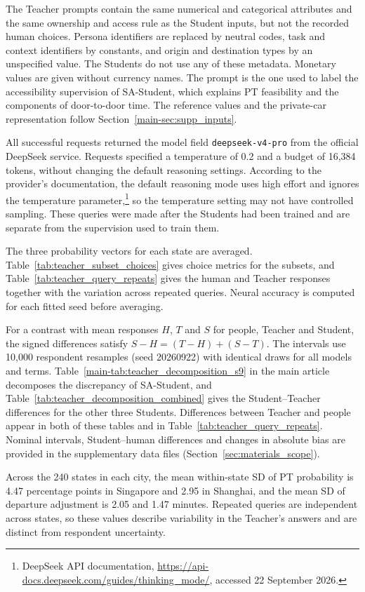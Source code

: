 The Teacher prompts contain the same numerical and categorical attributes and the same ownership and access rule as the Student inputs, but not the recorded human choices. Persona identifiers are replaced by neutral codes, task and context identifiers by constants, and origin and destination types by an unspecified value. The Students do not use any of these metadata. Monetary values are given without currency names. The prompt is the one used to label the accessibility supervision of SA-Student, which explains PT feasibility and the components of door-to-door time. The reference values and the private-car representation follow Section~\ref{main-sec:supp_inputs}.

All successful requests returned the model field \texttt{deepseek-v4-pro} from the official DeepSeek service. Requests specified a temperature of 0.2 and a budget of 16,384 tokens, without changing the default reasoning settings. According to the provider's documentation, the default reasoning mode uses high effort and ignores the temperature parameter,\footnote{DeepSeek API documentation, \url{https://api-docs.deepseek.com/guides/thinking_mode/}, accessed 22 September 2026.} so the temperature setting may not have controlled sampling. These queries were made after the Students had been trained and are separate from the supervision used to train them.

The three probability vectors for each state are averaged. Table~\ref{tab:teacher_subset_choices} gives choice metrics for the subsets, and Table~\ref{tab:teacher_query_repeats} gives the human and Teacher responses together with the variation across repeated queries. Neural accuracy is computed for each fitted seed before averaging.



For a contrast with mean responses $H$, $T$ and $S$ for people, Teacher and Student, the signed differences satisfy $S-H=(T-H)+(S-T)$. The intervals use 10,000 respondent resamples (seed 20260922) with identical draws for all models and terms. Table~\ref{main-tab:teacher_decomposition_s9} in the main article decomposes the discrepancy of SA-Student, and Table~\ref{tab:teacher_decomposition_combined} gives the Student--Teacher differences for the other three Students. Differences between Teacher and people appear in both of these tables and in Table~\ref{tab:teacher_query_repeats}. Nominal intervals, Student--human differences and changes in absolute bias are provided in the supplementary data files (Section~\ref{sec:materials_scope}).

Across the 240 states in each city, the mean within-state SD of PT probability is 4.47 percentage points in Singapore and 2.95 in Shanghai, and the mean SD of departure adjustment is 2.05 and 1.47 minutes. Repeated queries are independent across states, so these values describe variability in the Teacher's answers and are distinct from respondent uncertainty.


